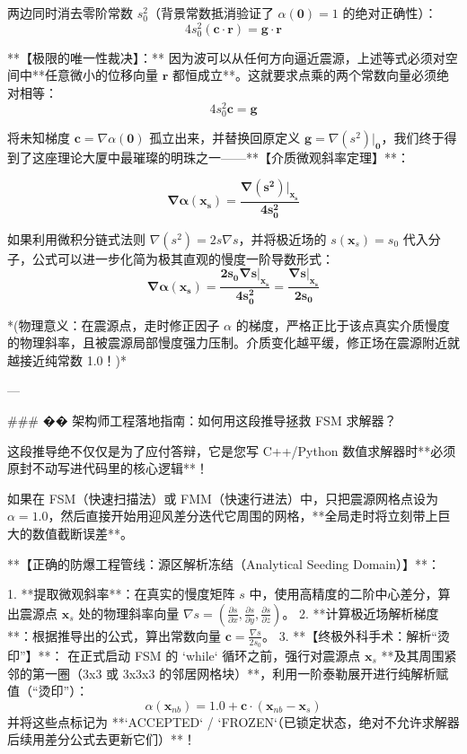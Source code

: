 \documentclass[12pt]{article}
\begin{document}
{两边同时消去零阶常数 $s_0^2$（背景常数抵消验证了 $\alpha(\mathbf{0})=1$ 的绝对正确性）：
$$ 4 s_0^2 (\mathbf{c} \cdot \mathbf{r}) = \mathbf{g} \cdot \mathbf{r} $$

**【极限的唯一性裁决】：**
因为波可以从任何方向逼近震源，上述等式必须对空间中**任意微小的位移向量 $\mathbf{r}$ 都恒成立**。这就要求点乘的两个常数向量必须绝对相等：
$$ 4 s_0^2 \mathbf{c} = \mathbf{g} $$

将未知梯度 $\mathbf{c} = \nabla \alpha(\mathbf{0})$ 孤立出来，并替换回原定义 $\mathbf{g} = \nabla(s^2)|_{\mathbf{0}}$，我们终于得到了这座理论大厦中最璀璨的明珠之一——**【介质微观斜率定理】**：

$$ \mathbf{\nabla \alpha(\mathbf{x}_s) = \frac{\nabla(s^2)|_{\mathbf{x}_s}}{4 s_0^2}} $$

如果利用微积分链式法则 $\nabla(s^2) = 2s \nabla s$，并将极近场的 $s(\mathbf{x}_s) = s_0$ 代入分子，公式可以进一步化简为极其直观的慢度一阶导数形式：
$$ \mathbf{\nabla \alpha(\mathbf{x}_s) = \frac{2 s_0 \nabla s|_{\mathbf{x}_s}}{4 s_0^2} = \frac{\nabla s|_{\mathbf{x}_s}}{2 s_0}} $$

*(物理意义：在震源点，走时修正因子 $\alpha$ 的梯度，严格正比于该点真实介质慢度的物理斜率，且被震源局部慢度强力压制。介质变化越平缓，修正场在震源附近就越接近纯常数 1.0！)*

---

### �� 架构师工程落地指南：如何用这段推导拯救 FSM 求解器？

这段推导绝不仅仅是为了应付答辩，它是您写 C++/Python 数值求解器时**必须原封不动写进代码里的核心逻辑**！

如果在 FSM（快速扫描法）或 FMM（快速行进法）中，只把震源网格点设为 $\alpha=1.0$，然后直接开始用迎风差分迭代它周围的网格，**全局走时将立刻带上巨大的数值截断误差**。

**【正确的防爆工程管线：源区解析冻结（Analytical Seeding Domain）】**：

1.  **提取微观斜率**：在真实的慢度矩阵 $s$ 中，使用高精度的二阶中心差分，算出震源点 $\mathbf{x}_s$ 处的物理斜率向量 $\nabla s = ( \frac{\partial s}{\partial x}, \frac{\partial s}{\partial y}, \frac{\partial s}{\partial z} )$。
2.  **计算极近场解析梯度**：根据推导出的公式，算出常数向量 $\mathbf{c} = \frac{\nabla s}{2 s_0}$。
3.  **【终极外科手术：解析“烫印”】**：
    在正式启动 FSM 的 `while` 循环之前，强行对震源点 $\mathbf{x}_s$ **及其周围紧邻的第一圈（3x3 或 3x3x3 的邻居网格块）**，利用一阶泰勒展开进行纯解析赋值（“烫印”）：
    $$ \alpha(\mathbf{x}_{nb}) = 1.0 + \mathbf{c} \cdot (\mathbf{x}_{nb} - \mathbf{x}_s) $$
    并将这些点标记为 **`ACCEPTED` / `FROZEN`（已锁定状态，绝对不允许求解器后续用差分公式去更新它们）**！








}
\end{document}
